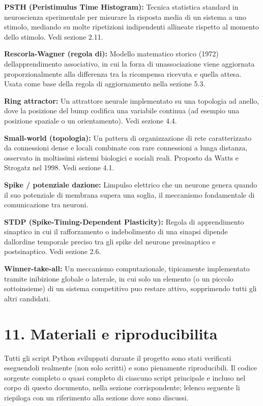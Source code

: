 \documentclass[
  italian,
]{article}
\begin{document}
\textbf{PSTH (Peristimulus Time Histogram):} Tecnica statistica standard in neuroscienza sperimentale per misurare la risposta media di un sistema a uno stimolo, mediando su molte ripetizioni indipendenti allineate rispetto al momento dello stimolo. Vedi sezione 2.11.

\textbf{Rescorla-Wagner (regola di):} Modello matematico storico (1972) dell\textquotesingle apprendimento associativo, in cui la forza di un\textquotesingle associazione viene aggiornata proporzionalmente alla differenza tra la ricompensa ricevuta e quella attesa. Usata come base della regola di aggiornamento nella sezione 5.3.

\textbf{Ring attractor:} Un attrattore neurale implementato su una topologia ad anello, dove la posizione del bump codifica una variabile continua (ad esempio una posizione spaziale o un orientamento). Vedi sezione 4.4.

\textbf{Small-world (topologia):} Un pattern di organizzazione di rete caratterizzato da connessioni dense e locali combinate con rare connessioni a lunga distanza, osservato in moltissimi sistemi biologici e sociali reali. Proposto da Watts e Strogatz nel 1998. Vedi sezione 4.1.

\textbf{Spike / potenziale d\textquotesingle azione:} L\textquotesingle impulso elettrico che un neurone genera quando il suo potenziale di membrana supera una soglia, il meccanismo fondamentale di comunicazione tra neuroni.

\textbf{STDP (Spike-Timing-Dependent Plasticity):} Regola di apprendimento sinaptico in cui il rafforzamento o indebolimento di una sinapsi dipende dall\textquotesingle ordine temporale preciso tra gli spike del neurone presinaptico e postsinaptico. Vedi sezione 2.6.

\textbf{Winner-take-all:} Un meccanismo computazionale, tipicamente implementato tramite inibizione globale o laterale, in cui solo un elemento (o un piccolo sottoinsieme) di un sistema competitivo puo\textquotesingle{} restare attivo, sopprimendo tutti gli altri candidati.

\section{11. Materiali e riproducibilita\textquotesingle{}}\label{materiali-e-riproducibilita}

Tutti gli script Python sviluppati durante il progetto sono stati verificati eseguendoli realmente (non solo scritti) e sono pienamente riproducibili. Il codice sorgente completo o quasi completo di ciascuno script principale e\textquotesingle{} incluso nel corpo di questo documento, nella sezione corrispondente; l\textquotesingle elenco seguente li riepiloga con un riferimento alla sezione dove sono discussi.
\end{document}
